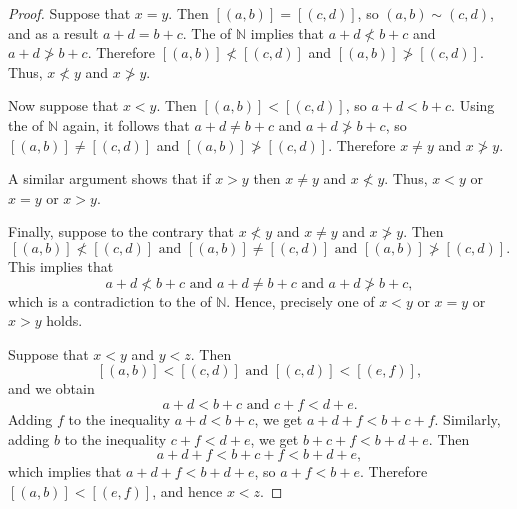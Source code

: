 \begin{proof}
	Suppose that $x = y$. Then $[(a, b)] = [(c, d)]$, so $(a, b) \sim (c, d)$, and as a result $a + d = b + c$. The  of $\mathbb{N}$ implies that $a + d \nless b + c$ and $a + d \ngtr b + c$. Therefore $[(a, b)] \nless [(c, d)]$ and $[(a, b)] \ngtr [(c, d)]$. Thus, $x \nless y$ and $x \ngtr y$.

	Now suppose that $x < y$. Then $[(a, b)] < [(c, d)]$, so $a + d < b + c$. Using the  of $\mathbb{N}$ again, it follows that
	$a + d \not= b + c$ and $a + d \ngtr b + c$, so ${[(a, b)] \not= [(c, d)]}$ and $[(a, b)] \ngtr [(c, d)]$. Therefore $x \not= y$ and $x \ngtr y$.

	A similar argument shows that if $x > y$ then $x \not= y$ and $x \nless y$.  Thus, $x < y$ or $x = y$ or $x > y$.

	Finally, suppose to the contrary that $x \nless y$ and $x \not= y$ and $x \ngtr y$. Then
	$$
		[(a, b)] \nless [(c, d)] \text{ and } [(a, b)] \not= [(c, d)] \text{ and } [(a, b)] \ngtr [(c, d)].
	$$
	This implies that
	$$
		a + d \nless b + c \text{ and } a + d \not= b + c \text{ and } a + d \ngtr b + c,
	$$
	which is a contradiction to the  of $\mathbb{N}$. Hence, precisely one of $x < y$ or $x = y$ or $x > y$ holds.

	Suppose that $x < y$ and $y < z$. Then
	$$
		[(a, b)] < [(c, d)] \text{ and } [(c, d)] < [(e, f)],
	$$
	and we obtain
	$$
		a + d < b + c \text{ and } c + f < d + e.
	$$
	Adding $f$ to the inequality $a + d < b + c$, we get $a + d + f < b + c + f$. Similarly, adding $b$ to the inequality $c + f < d + e$, we get $b + c + f < b + d + e$. Then
	$$
		a + d + f < b + c + f < b + d + e,
	$$
	which implies that $a + d + f < b + d + e$, so $a + f < b + e$. Therefore $[(a, b)] < [(e, f)]$, and hence $x < z$.


\end{proof}
